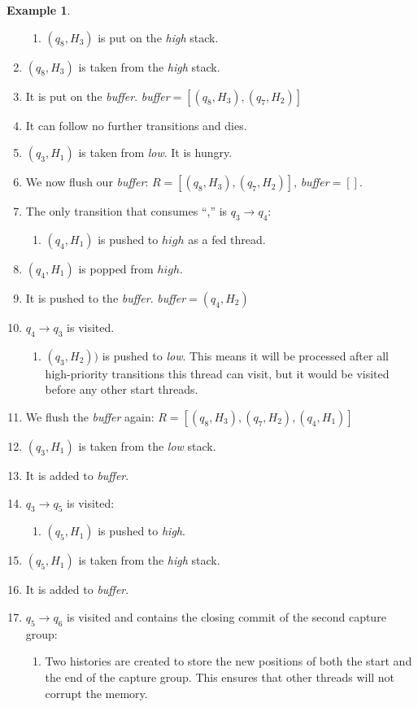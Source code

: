 \documentclass[english]{sigplanconf}
\theoremstyle{definition}
\newtheorem{example}{Example}[section]
\begin{document}
\begin{example}
\begin{enumerate}
\begin{enumerate}
	\item $(q_8, H_3)$ is put on the \emph{high} stack.
\end{enumerate}
\item $(q_8, H_3)$ is taken from the \emph{high} stack.
\item It is put on the \emph{buffer}. \emph{buffer}$=[(q_8, H_3), (q_7, H_2)]$
\item It can follow no further transitions and dies.
\item $(q_3, H_1)$ is taken from \emph{low}. It is hungry.
\item We now flush our \emph{buffer}: $R=[(q_8, H_3), (q_7, H_2)]$, \emph{buffer}$=[]$.
\item The only transition that consumes ``,'' is $q_3\rightarrow q_4$:\begin{enumerate}
	\item $(q_4, H_1)$ is pushed to $high$ as a fed thread.
\end{enumerate}
\item $(q_4, H_1)$ is popped from $high$.
\item It is pushed to the \emph{buffer}. \emph{buffer}$=(q_4, H_2)$
\item $q_4\rightarrow q_3$ is visited. \begin{enumerate}
	\item $(q_3, H_2))$ is pushed to \emph{low}. This means it will be processed after all high-priority 
	transitions this thread can visit, but it would be visited before any other start threads.
\end{enumerate}
\item We flush the \emph{buffer} again: $R=[(q_8, H_3), (q_7, H_2), (q_4, H_1)]$
\item $(q_3, H_1)$ is taken from the \emph{low} stack.
\item It is added to \emph{buffer}.
\item $q_3\rightarrow q_5$ is visited:\begin{enumerate}
	\item $(q_5, H_1)$ is pushed to \emph{high}.
\end{enumerate}
\item $(q_5, H_1)$ is taken from the \emph{high} stack.
\item It is added to \emph{buffer}.
\item $q_5\rightarrow q_6$ is visited and contains the closing commit of the second capture group:\begin{enumerate}
	\item Two histories are created to store the new positions of both the start and the end of the capture group. This ensures that other threads will not corrupt the memory.

\end{enumerate}
\end{enumerate}
\end{example}
\end{document}
